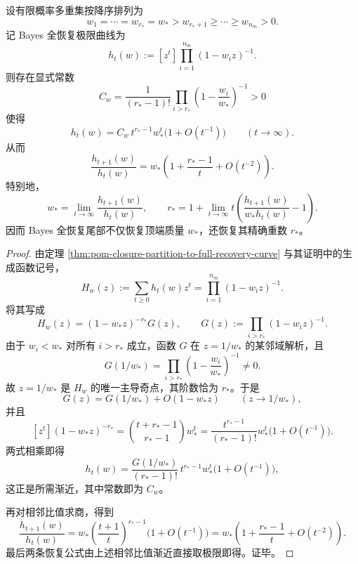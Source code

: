 \begin{theorem}\label{thm:conclusion-bayes-full-recovery-top-pole}
设有限概率多重集按降序排列为
\[
w_1=\cdots=w_{r_\ast}=w_\ast>w_{r_\ast+1}\ge\cdots\ge w_{n_m}>0.
\]
记 Bayes 全恢复极限曲线为
\[
h_t(w):=[z^t]\prod_{i=1}^{n_m}(1-w_i z)^{-1}.
\]
则存在显式常数
\[
C_w=\frac{1}{(r_\ast-1)!}\prod_{i>r_\ast}\left(1-\frac{w_i}{w_\ast}\right)^{-1}>0
\]
使得
\[
h_t(w)=C_w\,t^{r_\ast-1}w_\ast^t\bigl(1+O(t^{-1})\bigr)
\qquad (t\to\infty).
\]
从而
\[
\frac{h_{t+1}(w)}{h_t(w)}
=
w_\ast\left(1+\frac{r_\ast-1}{t}+O(t^{-2})\right).
\]
特别地，
\[
w_\ast=\lim_{t\to\infty}\frac{h_{t+1}(w)}{h_t(w)},
\qquad
r_\ast
=
1+\lim_{t\to\infty}
t\left(\frac{h_{t+1}(w)}{w_\ast h_t(w)}-1\right).
\]
因而 Bayes 全恢复尾部不仅恢复顶端质量 \(w_\ast\)，还恢复其精确重数 \(r_\ast\)。
\end{theorem}
\begin{proof}
由定理 \ref{thm:pom-closure-partition-to-full-recovery-curve} 与其证明中的生成函数记号，
\[
H_w(z):=\sum_{t\ge 0} h_t(w)z^t
=
\prod_{i=1}^{n_m}(1-w_i z)^{-1}.
\]
将其写成
\[
H_w(z)=(1-w_\ast z)^{-r_\ast}G(z),
\qquad
G(z):=\prod_{i>r_\ast}(1-w_i z)^{-1}.
\]
由于 \(w_i<w_\ast\) 对所有 \(i>r_\ast\) 成立，函数 \(G\) 在 \(z=1/w_\ast\) 的某邻域解析，且
\[
G(1/w_\ast)=\prod_{i>r_\ast}\left(1-\frac{w_i}{w_\ast}\right)^{-1}\neq 0.
\]
故 \(z=1/w_\ast\) 是 \(H_w\) 的唯一主导奇点，其阶数恰为 \(r_\ast\)。于是
\[
G(z)=G(1/w_\ast)+O(1-w_\ast z)
\qquad (z\to 1/w_\ast),
\]
并且
\[
[z^t](1-w_\ast z)^{-r_\ast}
=
\binom{t+r_\ast-1}{r_\ast-1}w_\ast^t
=
\frac{t^{r_\ast-1}}{(r_\ast-1)!}w_\ast^t\bigl(1+O(t^{-1})\bigr).
\]
两式相乘即得
\[
h_t(w)
=
\frac{G(1/w_\ast)}{(r_\ast-1)!}\,
t^{r_\ast-1}w_\ast^t\bigl(1+O(t^{-1})\bigr),
\]
这正是所需渐近，其中常数即为 \(C_w\)。

再对相邻比值求商，得到
\[
\frac{h_{t+1}(w)}{h_t(w)}
=
w_\ast
\left(\frac{t+1}{t}\right)^{r_\ast-1}
\bigl(1+O(t^{-1})\bigr)
=
w_\ast\left(1+\frac{r_\ast-1}{t}+O(t^{-2})\right).
\]
最后两条恢复公式由上述相邻比值渐近直接取极限即得。证毕。
\end{proof}

